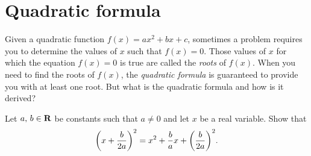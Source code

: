 \documentclass[a4paper,oneside,12pt]{article}
\begin{document}

\section{Quadratic formula}
\label{sec:quadratic_formula}

Given a quadratic function $f(x) = ax^2 + bx + c$, sometimes a problem
requires you to determine the values of $x$ such that $f(x) = 0$.
Those values of $x$ for which the equation $f(x) = 0$ is true are
called the \emph{roots} of $f(x)$.  When you need to find the roots of
$f(x)$, the \emph{quadratic formula} is guaranteed to provide you with
at least one root.  But what is the quadratic formula and how is it
derived?

\begin{exercise}
\label{ex:completing_the_square}
Let ${a},\, {b} \in \mathbf{R}$ be constants such that $a \neq 0$ and let
$x$ be a real variable.  Show that
\[
\parenthesis*{x + \frac{b}{2a}}^2
=
x^2 + \frac{b}{a} x + \parenthesis*{\frac{b}{2a}}^2.
\]
\end{exercise}
\end{document}
